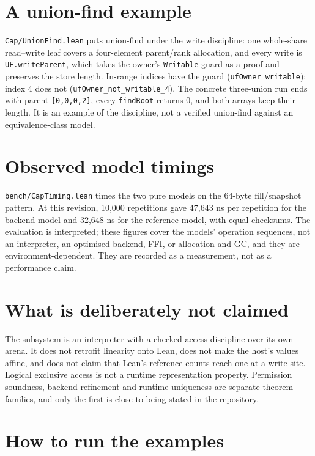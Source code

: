 \documentclass[10pt,a4paper]{article}
\newcommand{\file}[1]{\texttt{\small #1}}
\begin{document}
\section{A union-find example}

\file{Cap/UnionFind.lean} puts union-find under the write discipline: one
whole-share read--write leaf covers a four-element parent/rank allocation, and every
write is \texttt{UF.writeParent}, which takes the owner's \texttt{Writable} guard
as a proof and preserves the store length. In-range indices have the guard
(\texttt{ufOwner\_writable}); index 4 does not
(\texttt{ufOwner\_not\_writable\_4}). The concrete three-union run ends with
parent \texttt{[0,0,0,2]}, every \texttt{findRoot} returns 0, and both arrays keep
their length. It is an example of the discipline, not a verified union-find against
an equivalence-class model.

\section{Observed model timings}

\file{bench/CapTiming.lean} times the two pure models on the 64-byte
fill/snapshot pattern. At this revision, 10,000 repetitions gave 47,643 ns per
repetition for the backend model and 32,648 ns for the reference model, with equal
checksums. The evaluation is interpreted; these figures cover the models'
operation sequences, not an interpreter, an optimised backend, FFI, or
allocation and GC, and they are environment-dependent. They are recorded as a
measurement, not as a performance claim.

\section{What is deliberately not claimed}

The subsystem is an interpreter with a checked access discipline over its own
arena. It does not retrofit linearity onto Lean, does not make the host's values
affine, and does not claim that Lean's reference counts reach one at a write site.
Logical exclusive access is not a runtime representation property. Permission
soundness, backend refinement and runtime uniqueness are separate theorem
families, and only the first is close to being stated in the repository.

\section{How to run the examples}
\end{document}
